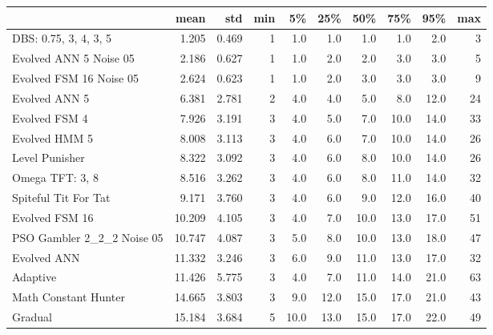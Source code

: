 \begin{tabular}{lrrrrrrrrr}
\toprule
{} &    mean &    std &  min &    5\% &   25\% &   50\% &   75\% &   95\% &  max \\
\midrule
DBS: 0.75, 3, 4, 3, 5      &   1.205 &  0.469 &    1 &   1.0 &   1.0 &   1.0 &   1.0 &   2.0 &    3 \\
Evolved ANN 5 Noise 05     &   2.186 &  0.627 &    1 &   1.0 &   2.0 &   2.0 &   3.0 &   3.0 &    5 \\
Evolved FSM 16 Noise 05    &   2.624 &  0.623 &    1 &   1.0 &   2.0 &   3.0 &   3.0 &   3.0 &    9 \\
Evolved ANN 5              &   6.381 &  2.781 &    2 &   4.0 &   4.0 &   5.0 &   8.0 &  12.0 &   24 \\
Evolved FSM 4              &   7.926 &  3.191 &    3 &   4.0 &   5.0 &   7.0 &  10.0 &  14.0 &   33 \\
Evolved HMM 5              &   8.008 &  3.113 &    3 &   4.0 &   6.0 &   7.0 &  10.0 &  14.0 &   26 \\
Level Punisher             &   8.322 &  3.092 &    3 &   4.0 &   6.0 &   8.0 &  10.0 &  14.0 &   26 \\
Omega TFT: 3, 8            &   8.516 &  3.262 &    3 &   4.0 &   6.0 &   8.0 &  11.0 &  14.0 &   32 \\
Spiteful Tit For Tat       &   9.171 &  3.760 &    3 &   4.0 &   6.0 &   9.0 &  12.0 &  16.0 &   40 \\
Evolved FSM 16             &  10.209 &  4.105 &    3 &   4.0 &   7.0 &  10.0 &  13.0 &  17.0 &   51 \\
PSO Gambler 2\_2\_2 Noise 05 &  10.747 &  4.087 &    3 &   5.0 &   8.0 &  10.0 &  13.0 &  18.0 &   47 \\
Evolved ANN                &  11.332 &  3.246 &    3 &   6.0 &   9.0 &  11.0 &  13.0 &  17.0 &   32 \\
Adaptive                   &  11.426 &  5.775 &    3 &   4.0 &   7.0 &  11.0 &  14.0 &  21.0 &   63 \\
Math Constant Hunter       &  14.665 &  3.803 &    3 &   9.0 &  12.0 &  15.0 &  17.0 &  21.0 &   43 \\
Gradual                    &  15.184 &  3.684 &    5 &  10.0 &  13.0 &  15.0 &  17.0 &  22.0 &   49 \\
\bottomrule
\end{tabular}
